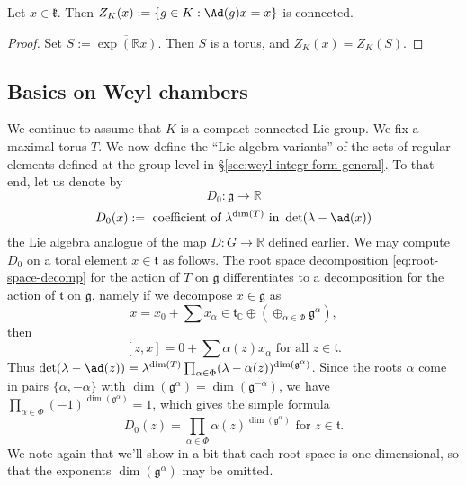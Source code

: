 \documentclass[reqno]{amsart} 
\begin{document}
\begin{corollary}\label{cor:Z-k-x-conn}
  Let $x \in \mathfrak{k}$.  Then $Z_K(x) := \{g \in K : \Ad(g) x = x\}$ is connected.
\end{corollary}
\begin{proof}
  Set $S := \overline{\exp(\mathbb{R} x)}$.  Then $S$ is a torus, and $Z_K(x) = Z_K(S)$.
\end{proof}

\subsection{Basics on Weyl chambers}\label{sec:basics-weyl-chambers}
We continue to assume that $K$ is a compact connected Lie group.  We fix a maximal torus $T$.  We now define the ``Lie algebra variants'' of the sets of regular elements defined at the group level in \S\ref{sec:weyl-integr-form-general}.  To that end, let us denote by
\begin{equation*}
  D_0 : \mathfrak{g} \rightarrow \mathbb{R}
\end{equation*}
\begin{equation*}
  D_0(x) := \text{ coefficient of } \lambda^{\dim(T)} \text{ in } \det(\lambda - \ad(x))
\end{equation*}
the Lie algebra analogue of the map $D : G \rightarrow \mathbb{R}$ defined earlier.  We may compute $D_0$ on a toral element $x \in \mathfrak{t}$ as follows.  The root space decomposition \eqref{eq:root-space-decomp} for the action of $T$ on $\mathfrak{g}$ differentiates to a decomposition for the action of $\mathfrak{t}$ on $\mathfrak{g}$, namely if we decompose $x \in \mathfrak{g}$ as
\begin{equation}\label{eq:root-space-decomp-of-x-again}
  x = x_0 + \sum x_\alpha
  \in \mathfrak{t}_{\mathbb{C}} \oplus (\oplus_{\alpha \in \Phi}
  \mathfrak{g}^\alpha),
\end{equation}
then
\begin{equation}\label{eq:adjoint-actino-on-root-sapce-decmop}
  [z,x]
  = 0 + \sum \alpha(z) x_\alpha
  \text{ for all }
  z \in \mathfrak{t}.
\end{equation}
Thus $\det(\lambda - \ad(z)) = \lambda^{\dim(T)} \prod_{\alpha \in \Phi } (\lambda - \alpha(z))^{\dim(\mathfrak{g}^\alpha)}$.  Since the roots $\alpha$ come in pairs $\{\alpha, - \alpha \}$ with $\dim(\mathfrak{g}^\alpha) = \dim(\mathfrak{g}^{-\alpha})$, we have $\prod_{\alpha \in \Phi} (-1)^{\dim(\mathfrak{g}^\alpha)} = 1$, which gives the simple formula
\begin{equation*}
  D_0(z) = \prod_{\alpha \in \Phi} \alpha(z)^{\dim(\mathfrak{g}^\alpha)} \text{ for } z \in \mathfrak{t}.
\end{equation*}
We note again that we'll show in a bit that each root space is one-dimensional, so that the exponents $\dim(\mathfrak{g}^\alpha)$ may be omitted.
\end{document}
